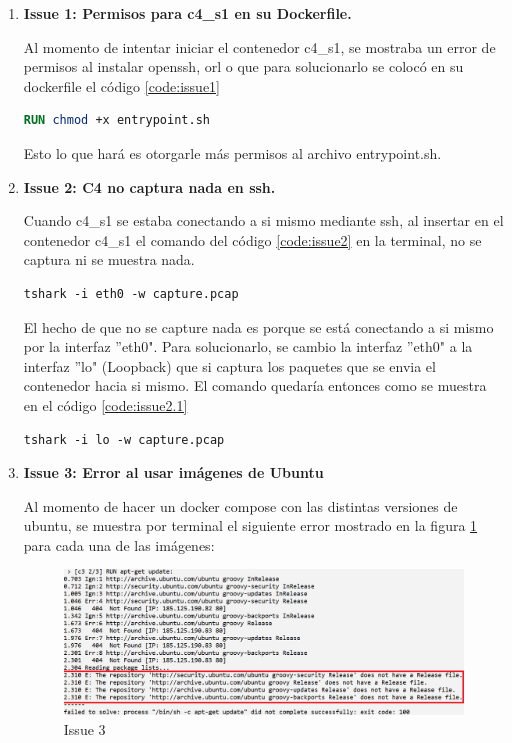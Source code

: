 \documentclass[letter,12pt]{article}
\newcounter{codecount}
\begin{document}
\begin{enumerate}
    \item \textbf{Issue 1: Permisos para c4\_s1 en su Dockerfile.}

Al momento de intentar iniciar el contenedor c4\_s1, se mostraba un error de permisos al instalar openssh, orl o que para solucionarlo se colocó en su dockerfile el código \ref{code:issue1}

\label{code:issue1}
\begin{lstlisting}[language=Dockerfile, caption={Solución al issue 1}]
RUN chmod +x entrypoint.sh
\end{lstlisting}

Esto lo que hará es otorgarle más permisos al archivo entrypoint.sh.

    \item \textbf{Issue 2: C4 no captura nada en ssh.}

Cuando c4\_s1 se estaba conectando a si mismo mediante ssh, al insertar en el contenedor c4\_s1 el comando del código \ref{code:issue2} en la terminal, no se captura ni se muestra nada.

\label{code:issue2}
\begin{lstlisting}[language=Dockerfile, caption={No captura paquetes a si mismo en c4\_s1}]
tshark -i eth0 -w capture.pcap
\end{lstlisting}

El hecho de que no se capture nada es porque se está conectando a si mismo por la interfaz ''eth0". Para solucionarlo, se cambio la interfaz ''eth0" a la interfaz ''lo" (Loopback) que si captura los paquetes que se envia el contenedor hacia si mismo. El comando quedaría entonces como se muestra en el código \ref{code:issue2.1}

\label{code:issue2.1}
\begin{lstlisting}[language=Dockerfile, caption={Solución al issue 2}]
tshark -i lo -w capture.pcap
\end{lstlisting}


\clearpage

    \item \textbf{Issue 3: Error al usar imágenes de Ubuntu }

Al momento de hacer un docker compose con las distintas versiones de ubuntu, se muestra por terminal el siguiente error mostrado en la figura \ref{fig:issue3} para cada una de las imágenes:

\begin{figure}[ht]
    \centering
    \includegraphics[width=1\linewidth]{Images/issues/issue3.png}
    \caption{Issue 3}
    \label{fig:issue3}
\end{figure}


\end{enumerate}
\end{document}
